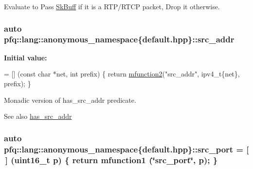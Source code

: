 Evaluate to {\ttfamily Pass} \hyperlink{structpfq_1_1lang_1_1SkBuff}{Sk\+Buff} if it is a R\+T\+P/\+R\+T\+C\+P packet, {\ttfamily Drop} it otherwise. 

\hypertarget{namespacepfq_1_1lang_1_1anonymous__namespace_02default_8hpp_03_a2ee09b5a65a64d60bc797b2ecd1c8a4a}{
\subsubsection[{src\+\_\+addr}]{\setlength{\rightskip}{0pt plus 5cm}auto pfq\+::lang\+::anonymous\+\_\+namespace\{default.\+hpp\}\+::src\+\_\+addr}}\label{namespacepfq_1_1lang_1_1anonymous__namespace_02default_8hpp_03_a2ee09b5a65a64d60bc797b2ecd1c8a4a}
{\bfseries Initial value\+:}
\begin{DoxyCode}
= [] (\textcolor{keyword}{const} \textcolor{keywordtype}{char} *net, \textcolor{keywordtype}{int} prefix)
        \{
            \textcolor{keywordflow}{return} \hyperlink{namespacepfq_1_1lang_aab1a000712bb2711044255ca1626cc84}{mfunction2}(\textcolor{stringliteral}{"src\_addr"}, ipv4\_t\{net\}, prefix);
        \}
\end{DoxyCode}


Monadic version of {\ttfamily has\+\_\+src\+\_\+addr} predicate. 

\begin{DoxySeeAlso}{See also}
\hyperlink{namespacepfq_1_1lang_1_1anonymous__namespace_02default_8hpp_03_acb03dd3e34d6dd7e83d621fa9077194c}{has\+\_\+src\+\_\+addr} 
\end{DoxySeeAlso}
\hypertarget{namespacepfq_1_1lang_1_1anonymous__namespace_02default_8hpp_03_ad1645151270994a4f396565b70233b73}{
\subsubsection[{src\+\_\+port}]{\setlength{\rightskip}{0pt plus 5cm}auto pfq\+::lang\+::anonymous\+\_\+namespace\{default.\+hpp\}\+::src\+\_\+port = \mbox{[}$\,$\mbox{]} (uint16\+\_\+t p) \{ return {\bf mfunction1} (\char`\"{}src\+\_\+port\char`\"{}, p); \}}}\label{namespacepfq_1_1lang_1_1anonymous__namespace_02default_8hpp_03_ad1645151270994a4f396565b70233b73}


